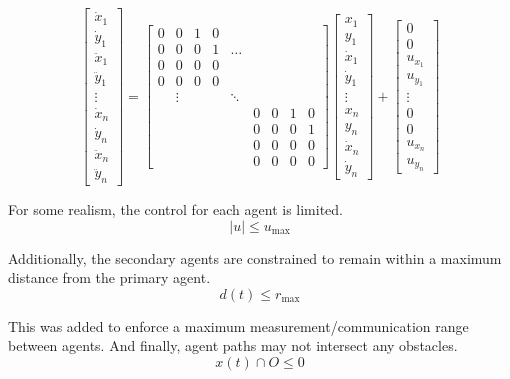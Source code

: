 \documentclass[conference]{IEEEtran}
\begin{document}
\[ \begin{bmatrix} \dot{x}_1 \\ \dot{y}_1 \\ \ddot{x}_1 \\ \ddot{y}_1 \\ \vdots \\ \dot{x}_n \\ \dot{y}_n \\ \ddot{x}_n \\ \ddot{y}_n \end{bmatrix}= \begin{bmatrix} 0 & 0 & 1 & 0 \\ 0 & 0 & 0 & 1 & \dots \\ 0 & 0 & 0 & 0 \\ 0 & 0 & 0 & 0 \\ &\vdots & & &  \ddots \\ & & & & & 0 & 0 & 1 & 0 \\ & & & & & 0 & 0 & 0 & 1 \\& & & & &  0 & 0 & 0 & 0 \\& & & & &  0 & 0 & 0 & 0 \end{bmatrix} \begin{bmatrix} x_1 \\ y_1 \\ \dot{x}_1 \\ \dot{y}_1 \\ \vdots \\ x_n \\ y_n \\ \dot{x}_n \\ \dot{y}_n \end{bmatrix} + \begin{bmatrix} 0 \\ 0 \\ u_{x_1} \\ u_{y_1} \\ \vdots \\ 0 \\ 0 \\ u_{x_n} \\ u_{y_n}\end{bmatrix}\]

For some realism, the control for each agent is limited.
\[ |u| \leq u_{\text{max}} \]

Additionally, the secondary agents are constrained to remain within a maximum distance from the primary agent. 
\[ d(t) \leq r_{\text{max}} \]

This was added to enforce a maximum measurement/communication range between agents. And finally, agent paths may not intersect any obstacles.
\[ x(t) \cap O \leq 0\]
\end{document}
